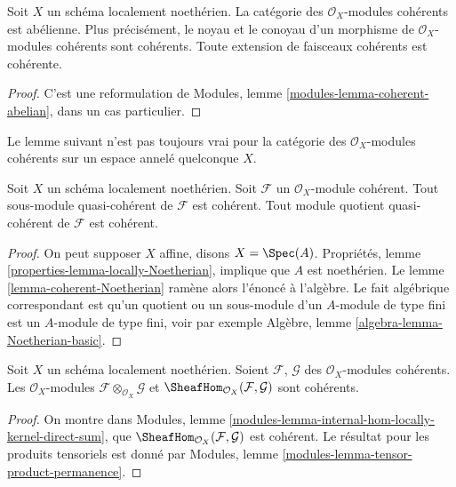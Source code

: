 \begin{lemma}
\label{lemma-coherent-abelian-Noetherian}
Soit $X$ un schéma localement noethérien.
La catégorie des $\mathcal{O}_X$-modules cohérents est
abélienne. Plus précisément, le noyau et le conoyau d'un morphisme de
$\mathcal{O}_X$-modules cohérents sont cohérents. Toute extension
de faisceaux cohérents est cohérente.
\end{lemma}

\begin{proof}
C'est une reformulation de
Modules, lemme \ref{modules-lemma-coherent-abelian},
dans un cas particulier.
\end{proof}

\noindent
Le lemme suivant n'est pas toujours vrai pour la catégorie des
$\mathcal{O}_X$-modules cohérents sur un espace annelé quelconque $X$.

\begin{lemma}
\label{lemma-coherent-Noetherian-quasi-coherent-sub-quotient}
Soit $X$ un schéma localement noethérien.
Soit $\mathcal{F}$ un $\mathcal{O}_X$-module
cohérent. Tout sous-module quasi-cohérent de $\mathcal{F}$ est cohérent.
Tout module quotient quasi-cohérent de $\mathcal{F}$ est cohérent.
\end{lemma}

\begin{proof}
On peut supposer $X$ affine, disons $X = \Spec(A)$.
Propriétés, lemme \ref{properties-lemma-locally-Noetherian},
implique que $A$ est noethérien. Le lemme \ref{lemma-coherent-Noetherian}
ramène alors l'énoncé à l'algèbre. Le fait
algébrique correspondant est qu'un quotient ou un sous-module d'un $A$-module de
type fini est un $A$-module de type fini, voir par
exemple Algèbre, lemme \ref{algebra-lemma-Noetherian-basic}.
\end{proof}

\begin{lemma}
\label{lemma-tensor-hom-coherent}
Soit $X$ un schéma localement noethérien.
Soient $\mathcal{F}$, $\mathcal{G}$ des $\mathcal{O}_X$-modules cohérents.
Les $\mathcal{O}_X$-modules $\mathcal{F} \otimes_{\mathcal{O}_X} \mathcal{G}$
et $\SheafHom_{\mathcal{O}_X}(\mathcal{F}, \mathcal{G})$ sont
cohérents.
\end{lemma}

\begin{proof}
On montre dans
Modules, lemme \ref{modules-lemma-internal-hom-locally-kernel-direct-sum}, que
$\SheafHom_{\mathcal{O}_X}(\mathcal{F}, \mathcal{G})$ est cohérent. Le
résultat pour les produits tensoriels est donné
par Modules, lemme \ref{modules-lemma-tensor-product-permanence}.
\end{proof}

